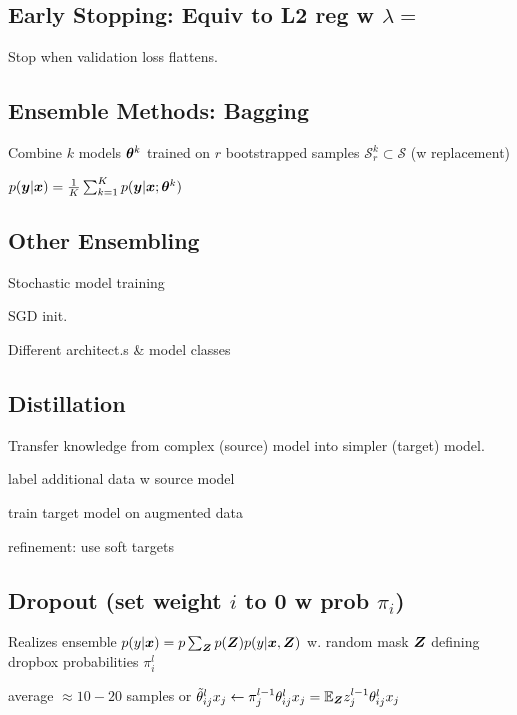 \subsection*{Early Stopping: Equiv to L2 reg w $\lambda=$}
Stop when validation loss flattens.

\subsection*{Ensemble Methods: Bagging}
 Combine $k$ models $\boldsymbol{\theta}^k$ trained on $r$ bootstrapped samples $\mathcal{S}^k_r\subset \mathcal{S}$ (w replacement)

 $p(\boldsymbol{y}|\boldsymbol{x})=\frac{1}{K}\sum^K_{k=1}p(\boldsymbol{y}|\boldsymbol{x};\boldsymbol{\theta}^k)$

\subsection*{Other Ensembling}
\begin{inparaitem}[$\color{mygreen} \triangleright$]
\item Stochastic model training \item SGD init. \item Different architect.s \& model classes 
\end{inparaitem}

\subsection*{Distillation}
Transfer knowledge from complex (source) model into simpler (target) model.

\begin{inparaitem}[$\color{mygreen} \triangleright$]
\item label additional data w source model
\item train target model on augmented data
\item refinement: use soft targets
\end{inparaitem}

\subsection*{Dropout (set weight $i$ to 0 w prob $\pi_i$)}
Realizes ensemble
$p(y|\boldsymbol{x})=p\sum_{\boldsymbol{Z}}p(\boldsymbol{Z})p(y|\boldsymbol{x},\boldsymbol{Z})$ w. random mask $\boldsymbol{Z}$ defining dropbox probabilities $\pi^l_i$

 average $\approx10-20$ samples or $\tilde{\theta}_{ij}^l x_j\leftarrow \pi^{l-1}_j\theta_{ij}^l x_j=\mathbb{E}_{\boldsymbol{Z}} z^{l-1}_j\theta^l_{ij}x_j$

